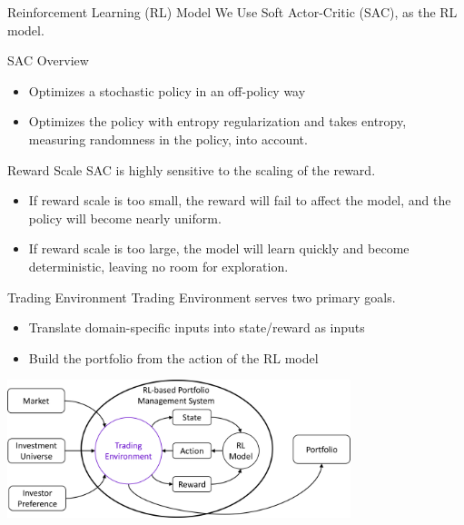 \begin{frame}{Reinforcement Learning (RL) Model}
We Use Soft Actor-Critic (SAC), as the RL model.
\begin{block}{SAC Overview}
\begin{itemize}
    \item Optimizes a stochastic policy in an off-policy way
    \item Optimizes the policy with \alert{entropy regularization} and takes entropy, measuring randomness in the policy, into account.
\end{itemize}
\end{block}
\begin{alertblock}{Reward Scale}
SAC is highly sensitive to the scaling of the reward. 
\begin{itemize}
    \item If reward scale is too small, the reward will fail to affect the model, and the policy will become nearly uniform.
    \item If reward scale is too large, the model will learn quickly and become deterministic, leaving no room for exploration.
\end{itemize}
\end{alertblock}
\end{frame}



\begin{frame}{Trading Environment}
Trading Environment serves two primary goals.
\\
\begin{itemize}
    \item Translate domain-specific inputs into state/reward as inputs
    \item Build the portfolio from the action of the RL model
\end{itemize}
\begin{center}
  \includegraphics[width=10cm]{images/trading_environment.png}
\end{center}
\end{frame}

